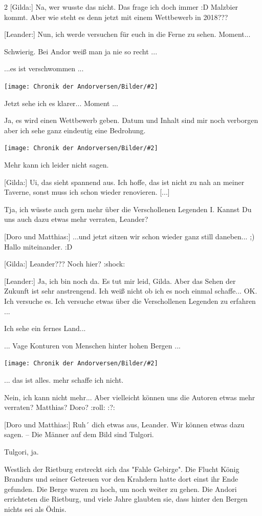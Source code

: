 \documentclass[10pt, a4paper, oneside]{book}
\newcommand{\bildmitts}[2][height=0.32\textwidth,width=0.48\textwidth,keepaspectratio]{%
    \begin{center}
        \texttt{[image: Chronik der Andorversen/Bilder/\#2]}
    \end{center}
}
\begin{document}
\begin{multicols}{2}
[Gilda:] Na, wer wusste das nicht. Das frage ich doch immer :D
Malzbier kommt. Aber wie steht es denn jetzt mit einem Wettbewerb in 2018???

[Leander:] Nun, ich werde versuchen für euch in die Ferne zu sehen. Moment...

Schwierig. Bei Andor weiß man ja nie so recht ...

...es ist verschwommen ...

\bildmitts{Online-Tavernen-Weihnachts-Party 2017 2.jpeg}

Jetzt sehe ich es klarer... Moment ...

Ja, es wird einen Wettbewerb geben. Datum und Inhalt sind mir noch verborgen aber ich sehe ganz eindeutig eine Bedrohung.

\bildmitts{Online-Tavernen-Weihnachts-Party 2017 3.jpeg}

Mehr kann ich leider nicht sagen.

[Gilda:] Ui, das sieht spannend aus. Ich hoffe, das ist nicht zu nah an meiner Taverne, sonst muss ich schon wieder renovieren. [...]

Tja, ich wüsste auch gern mehr über die Verschollenen Legenden I.
Kannst Du uns auch dazu etwas mehr verraten, Leander?

[Doro und Matthias:] ...und jetzt sitzen wir schon wieder ganz still daneben... ;)
Hallo miteinander. :D

[Gilda:] Leander??? Noch hier? :shock:


[Leander:] Ja, ich bin noch da. Es tut mir leid, Gilda. Aber das Sehen der Zukunft ist sehr anstrengend. Ich weiß nicht ob ich es noch einmal schaffe... OK. Ich versuche es. Ich versuche etwas über die Verschollenen Legenden zu erfahren ...

Ich sehe ein fernes Land...

... Vage Konturen von Menschen hinter hohen Bergen ...

\bildmitts{Leander sieht Verschollene Legenden (2017).jpg}

... das ist alles. mehr schaffe ich nicht.

Nein, ich kann nicht mehr... Aber vielleicht können uns die Autoren etwas mehr verraten? Matthias? Doro? :roll: :?:

[Doro und Matthias:] Ruh´ dich etwas aus, Leander. Wir können etwas dazu sagen.
– Die Männer auf dem Bild sind Tulgori.

Tulgori, ja.

Westlich der Rietburg erstreckt sich das "Fahle Gebirge". Die Flucht König Brandurs und seiner Getreuen vor den Krahdern hatte dort einst ihr Ende gefunden. Die Berge waren zu hoch, um noch weiter zu gehen. Die Andori errichteten die Rietburg, und viele Jahre glaubten sie, dass hinter den Bergen nichts sei als Ödnis.


\end{multicols}
\end{document}
